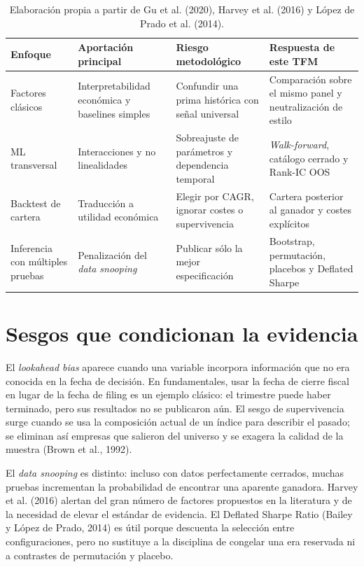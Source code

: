\begin{table}[H]
\centering
\small
\caption{Posicionamiento metodológico del estudio frente a líneas de literatura relevantes.}
\label{tab:posicionamiento}
\begin{tabularx}{\textwidth}{lXXX}
\toprule
Enfoque & Aportación principal & Riesgo metodológico & Respuesta de este TFM\\
\midrule
Factores clásicos & Interpretabilidad económica y baselines simples & Confundir una prima histórica con señal universal & Comparación sobre el mismo panel y neutralización de estilo\\
ML transversal & Interacciones y no linealidades & Sobreajuste de parámetros y dependencia temporal & \textit{Walk-forward}, catálogo cerrado y Rank-IC OOS\\
Backtest de cartera & Traducción a utilidad económica & Elegir por CAGR, ignorar costes o supervivencia & Cartera posterior al ganador y costes explícitos\\
Inferencia con múltiples pruebas & Penalización del \textit{data snooping} & Publicar sólo la mejor especificación & Bootstrap, permutación, placebos y Deflated Sharpe\\
\bottomrule
\end{tabularx}
\caption*{Elaboración propia a partir de Gu et al. (2020), Harvey et al. (2016) y
López de Prado et al. (2014).}
\end{table}

\section{Sesgos que condicionan la evidencia}

El \textit{lookahead bias} aparece cuando una variable incorpora información que no era conocida en
la fecha de decisión. En fundamentales, usar la fecha de cierre fiscal en lugar de la fecha de filing
es un ejemplo clásico: el trimestre puede haber terminado, pero sus resultados no se publicaron
aún. El sesgo de supervivencia surge cuando se usa la composición actual de un índice para describir
el pasado; se eliminan así empresas que salieron del universo y se exagera la calidad de la muestra
(Brown et al., 1992).

El \textit{data snooping} es distinto: incluso con datos perfectamente cerrados, muchas pruebas
incrementan la probabilidad de encontrar una aparente ganadora. Harvey et al. (2016) alertan
del gran número de factores propuestos en la literatura y de la necesidad de elevar el estándar de
evidencia. El Deflated Sharpe Ratio (Bailey y López de Prado, 2014) es útil porque descuenta la
selección entre configuraciones, pero
no sustituye a la disciplina de congelar una era reservada ni a contrastes de permutación y placebo.

